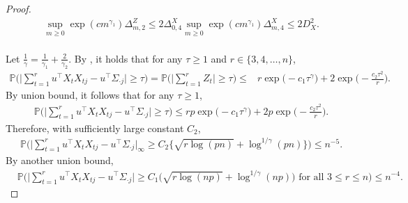 \documentclass[11pt]{article}
\newcommand{\p}{\mathbb P}
\theoremstyle{plain}
\theoremstyle{definition}
\begin{document}
\begin{proof}
\begin{align*}
    \sup_{m \geq 0} \exp(cm^{\gamma_1}) \Delta_{m,2} ^Z    \leq   2  \Delta ^X_{0 ,4}     \sup_{m \geq 0}\exp(cm^{\gamma_1}) \Delta ^X_{m ,4}       
    \le     2D_X ^2 .
\end{align*}  
\
\\ 
Let 
 $\frac{ 1}{\gamma}  = \frac{1}{\gamma_1}  +  \frac{ 2} { \gamma_2}$. By , it  holds that for any $\tau \ge 1$ and $r\in\{ 3,4,\ldots, n\}$, 
\begin{align*}
  \p\bigg(   \bigg| \sum_{t=1}^r  u^\top X_t X_{t j} - u^\top \Sigma_{ \cdot j }  \bigg|  \ge \tau   \bigg) =   \mathbb{P}\Big( \Big|\sum_{ t  = 1}^r  Z _t \Big| \geq \tau  \Big) \leq& r \exp\Big(-c_1  \tau ^{\gamma} \Big) + 2 \exp\Big(-\frac{c_2 \tau ^2}{ r    }\Big).
\end{align*}  
By   union bound, it follows that for any $\tau \ge 1$,
\begin{align*}
   \p\bigg(   \bigg| \sum_{t=1}^r  u^\top X_t X_{t j} - u^\top \Sigma_{ \cdot j }  \bigg|  \ge \tau   \bigg)  \leq  r p\exp\Big(-c_1  \tau ^{\gamma} \Big) + 2 p\exp\Big(-\frac{c_2 \tau ^2}{ r    }\Big).
\end{align*}  
Therefore, with sufficiently large constant $C_2 $,  
\begin{align*}
  \p\bigg(  \bigg| \sum_{t=1}^r  u^\top X_t X_{t j} - u^\top \Sigma_{ \cdot j }  \bigg|  _\infty  \ge  C_2 \bigg\{  \sqrt {  r  \log(pn)    }  +    \log^{1/\gamma }( pn)   \bigg \}  \bigg)   \leq   n^{-5} .
\end{align*}   
 By  another  union bound,
 \begin{align*} 
 &\p\bigg(  \bigg| \sum_{t=1}^r  u^\top X_t X_{t j} - u^\top \Sigma_{ \cdot j }  \bigg|    \ge C_1  \bigg( \sqrt { r  \log(np )  }  +  \log ^{1/\gamma }(np )  \bigg)    \text{ for all } 3\le r\le n  \bigg)\le n^{-4} .
 \end{align*} 
\end{proof}
 
\end{document}
